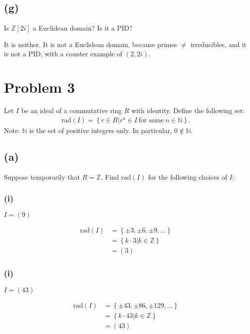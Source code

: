 \documentclass[10pt]{armath}
\newcommand{\Z}{\mathbb{Z}}
\newcommand{\N}{\mathbb{N}}
\newcommand{\zi}{\mathbb{Z}\left[2i\right]}
\newcommand{\rad}[1]{\text{rad}\left(#1\right)}
\begin{document}
\subsection*{(g)}%
\label{sub:_g_}

Is $\zi$ a Euclidean domain? Is it a PID\@?

It is neither. It is not a Euclidean domain, because primes $\neq$
irreducibles, and it is not a PID, with a counter example of $(2,2i)$.

\section*{Problem 3}%
\label{sec:problem_3}

Let $I$ be an ideal of a commutative ring $R$ with identity. Define the
following set:
\begin{align*}
  \rad{I}=\left\{r\in R|r^n\in I\ \text{for some}\ n\in\N\right\}.
\end{align*}
Note: $\N$ is the set of positive integers only. In particular, $0 \notin \N$.

\subsection*{(a)}%
\label{sub:_a3_}

Suppose temporarily that $R=\Z$. Find $\rad{I}$ for the following choices of
$I$:

\subsubsection*{(i)}%
\label{ssub:_i_}

$I=(9)$

\begin{align*}
  \rad{I}&=\left\{\pm 3, \pm6, \pm 9, \ldots\right\}\\
  &=\left\{k\cdot 3|k\in\Z\right\}\\
  &=(3)
\end{align*}

\subsubsection*{(i)}%
\label{ssub:_i_}

$I=(43)$

\begin{align*}
  \rad{I}&=\left\{\pm43, \pm86, \pm129, \ldots\right\}\\
  &=\left\{k\cdot 43|k\in\Z\right\}\\
  &=(43)
\end{align*}
\end{document}
